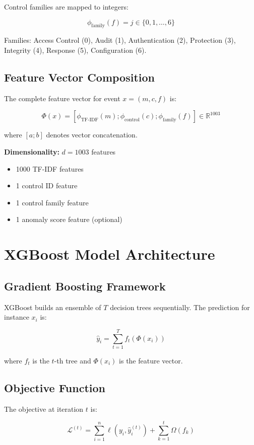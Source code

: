 \documentclass[12pt,a4paper]{article}
\begin{document}
Control families are mapped to integers:

$$\phi_{\text{family}}(f) = j \in \{0, 1, \ldots, 6\}$$

Families: Access Control (0), Audit (1), Authentication (2), Protection (3), Integrity (4), Response (5), Configuration (6).

\subsection{Feature Vector Composition}

The complete feature vector for event $x = (m, c, f)$ is:

$$\Phi(x) = [\phi_{\text{TF-IDF}}(m); \phi_{\text{control}}(c); \phi_{\text{family}}(f)] \in \mathbb{R}^{1003}$$

where $[a; b]$ denotes vector concatenation.

\textbf{Dimensionality:} $d = 1003$ features
\begin{itemize}
    \item 1000 TF-IDF features
    \item 1 control ID feature
    \item 1 control family feature
    \item 1 anomaly score feature (optional)
\end{itemize}

\section{XGBoost Model Architecture}

\subsection{Gradient Boosting Framework}

XGBoost builds an ensemble of $T$ decision trees sequentially. The prediction for instance $x_i$ is:

$$\hat{y}_i = \sum_{t=1}^{T} f_t(\Phi(x_i))$$

where $f_t$ is the $t$-th tree and $\Phi(x_i)$ is the feature vector.

\subsection{Objective Function}

The objective at iteration $t$ is:

$$\mathcal{L}^{(t)} = \sum_{i=1}^{n} \ell(y_i, \hat{y}_i^{(t)}) + \sum_{k=1}^{t} \Omega(f_k)$$
\end{document}

